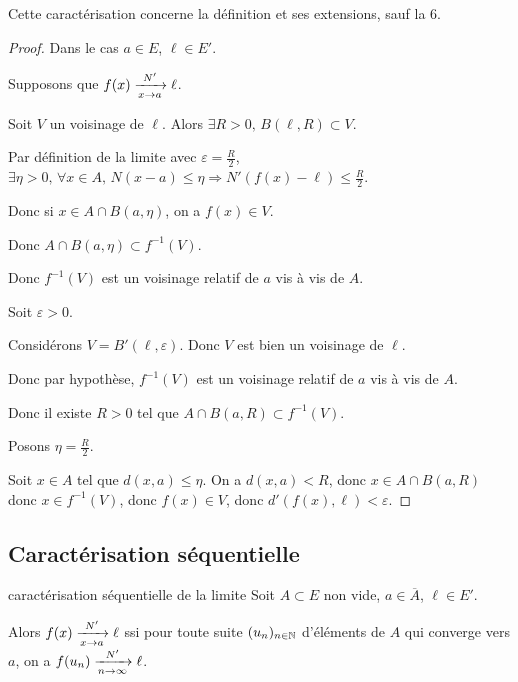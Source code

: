 \begin{remarque}
    Cette caractérisation concerne la définition et ses extensions, sauf la 6.
\end{remarque}


\begin{proof}
    Dans le cas $a \in E$, $\ell \in E'$. 

    Supposons que $f(x) \limitnorme{N'}{x}{a} \ell$.

    Soit $V$ un voisinage de $\ell$. Alors $\exists R > 0, \, B(\ell, R) \subset V$.

    Par définition de la limite avec $\varepsilon = \frac R 2$, $\exists \eta > 0, \, \forall x \in A, \, N(x - a) \leqslant \eta \Rightarrow N'(f(x) - \ell) \leqslant \frac R 2$.

    Donc si $x \in A \cap B(a, \eta)$, on a $f(x) \in V$. 

    Donc $A \cap B(a, \eta) \subset f^{-1}(V)$. 

    Donc $f^{-1}(V)$ est un voisinage relatif de $a$ vis à vis de $A$.


    \svspace Soit $\varepsilon > 0$. 

    Considérons $V = B'(\ell, \varepsilon)$. Donc $V$ est bien un voisinage de $\ell$. 

    Donc par hypothèse, $f^{-1}(V)$ est un voisinage relatif de $a$ vis à vis de $A$.

    Donc il existe $R > 0$ tel que $A \cap B(a, R) \subset f^{-1}(V)$.

    Posons $\eta = \frac R 2$. 

    Soit $x \in A$ tel que $d(x, a) \leqslant \eta$. On a $d(x, a) < R$, 
    donc $x \in A \cap B(a, R) $ donc $x \in f^{-1}(V)$, donc $f(x) \in V$, donc
    $d'(f(x), \ell) < \varepsilon$.
\end{proof}



\subsection{Caractérisation séquentielle }

\begin{theorement}{caractérisation séquentielle de la limite}{}
    Soit $A \subset E$ non vide, $a \in \overline A$, $\ell \in E'$. 

    Alors $f(x) \limitnorme{N'}{x}{a} \ell$ ssi pour toute suite $(u_n)_{n \in \N}$ 
    d'éléments de $A$ qui converge vers $a$, on a $f(u_n) \limitnorme{N'}{n}{\infty} \ell$.
\end{theorement}

